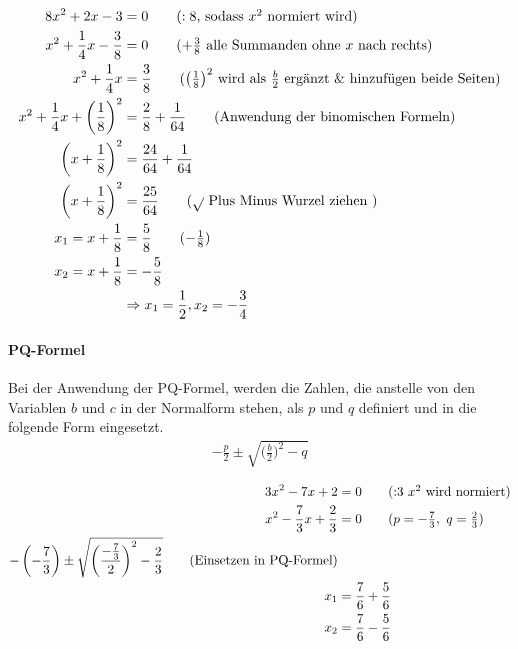 \begin{beispiel}
	\begin{align*}
		8x^2+2x-3&=0\tag{$:8$, sodass $x^2$ normiert wird}\\
		x^2+\frac{1}{4}x-\frac{3}{8}&=0\tag{$+\frac{3}{8}$ alle Summanden ohne $x$ nach rechts}\\
		x^2+\frac{1}{4}x&=\frac{3}{8}\tag{$\left(\frac{1}{8}\right)^2$ wird als $\frac{b}{2}$ ergänzt \& hinzufügen beide Seiten}\\
		x^2+\frac{1}{4}x+\left(\frac{1}{8}\right)^2&=\frac{2}{8}+\frac{1}{64}\tag{Anwendung der binomischen Formeln}\\
		\left(x+\frac{1}{8}\right)^2&=\frac{24}{64}+\frac{1}{64}\\
		\left(x+\frac{1}{8}\right)^2&=\frac{25}{64}\tag{$\sqrt{ }$ Plus Minus Wurzel ziehen }\\
		x_1= x+\frac{1}{8}&=\frac{5}{8}\tag{$-\frac{1}{8}$}\\
		x_2= x+\frac{1}{8}&=-\frac{5}{8}\\
		&\Rightarrow x_1=\frac{1}{2}, x_2=-\frac{3}{4}
	\end{align*}
\end{beispiel}
\pagebreak
\paragraph{PQ-Formel} Bei der Anwendung der PQ-Formel, werden die Zahlen, die anstelle von den Variablen $b$ und $c$ in der Normalform stehen, als $p$ und $q$ definiert und in die folgende Form eingesetzt. 
\begin{align*}
	-\frac{p}{2} \pm\sqrt{\bigg(\frac{b}{2}\bigg)^2-q}
\end{align*}

\begin{beispiel}
	\begin{align*}
		3x^2-7x+2&=0\tag{:3 $x^2$ wird normiert}\\
		x^2-\frac{7}{3}x+\frac{2}{3}&=0\tag{$p=-\frac{7}{3},\ q=\frac{2}{3}$}\\
		-\left(-\frac{7}{3}\right) \pm\sqrt{\left(\frac{-\frac{7}{3}}{2}\right)^2-\frac{2}{3}}\tag{Einsetzen in PQ-Formel}\\
		x_1&= \frac{7}{6}+\frac{5}{6}\\
		x_2&= \frac{7}{6}-\frac{5}{6}\\
	\end{align*}
\end{beispiel}